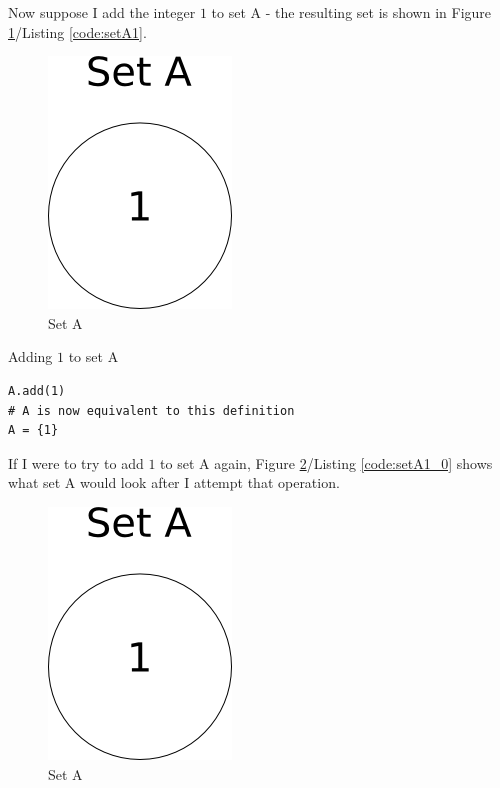 Now suppose I add the integer $1$ to set A - the resulting set is shown in Figure \ref{fig:setA1}/Listing \ref{code:setA1}.
\begin{center}
\begin{figure}[h]
\caption{Set A} \label{fig:setA1}
\includegraphics[scale=0.5]{figures/setA1.png}
\end{figure}
\end{center}

\begin{listing}[h]
\caption{Adding $1$ to set A}\label{code:setA1}
\begin{verbatim}
A.add(1)
# A is now equivalent to this definition
A = {1}
\end{verbatim}
\end{listing}

If I were to try to add $1$ to set A again, Figure \ref{fig:setA1_0}/Listing \ref{code:setA1_0} shows what set A would look after I attempt that operation.

\begin{center}
\begin{figure}
\caption{Set A} \label{fig:setA1_0}
\includegraphics[scale=0.5]{figures/setA1.png}
\end{figure}
\end{center}

